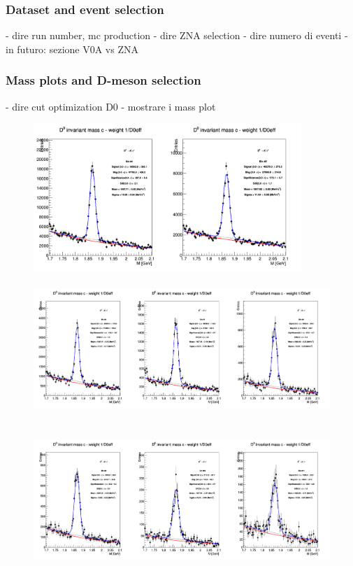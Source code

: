 \subsubsection{Dataset and event selection}
- dire run number, mc production
- dire ZNA selection
- dire numero di eventi
- in futuro: sezione V0A vs ZNA

\subsubsection{Mass plots and D-meson selection}
- dire cut optimization D0
- mostrare i mass plot

\begin{figure}[!htp]
\centering

{\includegraphics[width=1\linewidth, height=5.6cm]{figuresVsCent/Dzero/MassPlots/020/InvMassDistributions_Dzero_Bins4to5.png}}
{\includegraphics[width=1\linewidth, height=5.6cm]{figuresVsCent/Dzero/MassPlots/020/InvMassDistributions_Dzero_Bins6to8.png}}
{\includegraphics[width=1\linewidth, height=5.6cm]{figuresVsCent/Dzero/MassPlots/020/InvMassDistributions_Dzero_Bins9to11.png}}

\end{figure}
